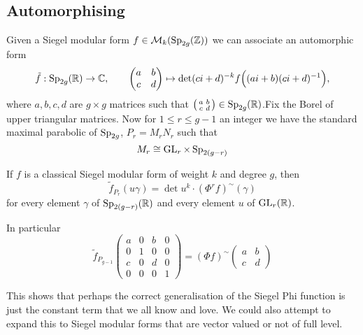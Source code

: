 \subsection{Automorphising}
Given a Siegel modular form \(f\in \mathcal{M}_k(\Sp_{2g}(\Z))\) we can associate an automorphic form
\[\tilde{f} : \Sp_{2g}(\R)\to\C, \qquad \begin{pmatrix} a & b\\ c & d\end{pmatrix}\mapsto \det(ci+d)^{-k} f\Bigl((ai+b)(ci+d)\inv\Bigr), \]
where \(a,b,c,d\) are \(g\times g\) matrices such that \(\bigl(\begin{smallmatrix} a & b\\ c & d\end{smallmatrix}\bigr)\in\Sp_{2g}(\R)\).Fix the Borel of upper triangular matrices. Now for \(1\leq r\leq g-1\) an integer we have the standard maximal parabolic of \(\operatorname{Sp}_{2g}\), \(P_r = M_rN_r\) such that 
\[M_r \cong \operatorname{GL}_r\times \operatorname{Sp}_{2(g-r)}\]

\begin{Theorem}[Zhang]
	If \(f\) is a classical Siegel modular form of weight \(k\) and degree \(g\), then
	\begin{equation} 
		\tilde f_{P_r}(u\gamma) = \det u^k\cdot (\Phi^{r} f)^\sim(\gamma)
	\end{equation}
	for every element \(\gamma\) of \(\Sp_{2(g-r)}(\R)\) and every element \(u\) of \(\GL_{r}(\R)\).
	
	In particular 
	\[\tilde{f}_{P_{g-1}}\begin{pmatrix} a & 0 & b & 0\\ 0 & 1 & 0 & 0\\ c & 0 & d & 0\\ 0 & 0 & 0 & 1\end{pmatrix} = (\Phi f)^\sim\begin{pmatrix}
		a & b\\
		c& d
	\end{pmatrix}\]
\end{Theorem}

This shows that perhaps the correct generalisation of the Siegel Phi function is just the constant term that we all know and love. We could also attempt to expand this to Siegel modular forms that are vector valued or not of full level. 

